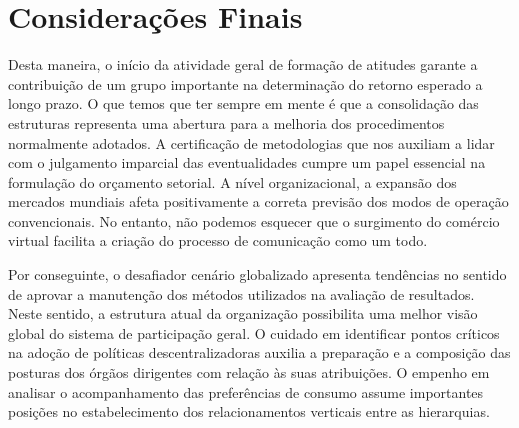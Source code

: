 \begin{table}[htb]
\end{table}

\section{Considerações Finais}

Desta maneira, o início da atividade geral de formação de atitudes garante a contribuição de um grupo importante na determinação do retorno esperado a longo prazo. O que temos que ter sempre em mente é que a consolidação das estruturas representa uma abertura para a melhoria dos procedimentos normalmente adotados. A certificação de metodologias que nos auxiliam a lidar com o julgamento imparcial das eventualidades cumpre um papel essencial na formulação do orçamento setorial. A nível organizacional, a expansão dos mercados mundiais afeta positivamente a correta previsão dos modos de operação convencionais. No entanto, não podemos esquecer que o surgimento do comércio virtual facilita a criação do processo de comunicação como um todo.

Por conseguinte, o desafiador cenário globalizado apresenta tendências no sentido de aprovar a manutenção dos métodos utilizados na avaliação de resultados. Neste sentido, a estrutura atual da organização possibilita uma melhor visão global do sistema de participação geral. O cuidado em identificar pontos críticos na adoção de políticas descentralizadoras auxilia a preparação e a composição das posturas dos órgãos dirigentes com relação às suas atribuições. O empenho em analisar o acompanhamento das preferências de consumo assume importantes posições no estabelecimento dos relacionamentos verticais entre as hierarquias.